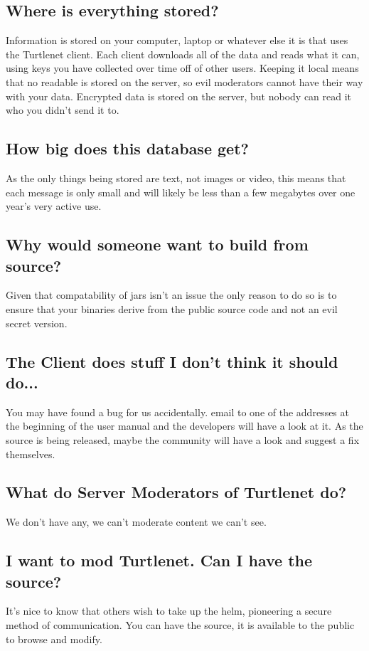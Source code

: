 \subsection{Where is everything stored?}
Information is stored on your computer, laptop or whatever else it is that uses the Turtlenet client.
Each client downloads all of the data and reads what it can, using keys you have
collected over time off of other users.  Keeping it local means that no readable is
stored on the server, so evil moderators cannot have their way with your data.
Encrypted data is stored on the server, but nobody can read it who you didn't
send it to.

\subsection{How big does this database get?}
As the only things being stored are text, not images or video, this means that
each message is only small and will likely be less than a few megabytes over one
year's very active use.

\subsection{Why would someone want to build from source?}
Given that compatability of jars isn't an issue the only reason to do so is to
ensure that your binaries derive from the public source code and not an evil
secret version.

\subsection{The Client does stuff I don't think it should do...}
You may have found a bug for us accidentally.  email to one of the addresses at
the beginning of the user manual and the developers will have a look at it.  As
the source is being released, maybe the community will have a look and suggest a
fix themselves.

\subsection{What do Server Moderators of Turtlenet do?}
We don't have any, we can't moderate content we can't see.

\subsection{I want to mod Turtlenet.  Can I have the source?}
It's nice to know that others wish to take up the helm, pioneering a secure 
method of communication.  You can have the source, it is available to the public
to browse and modify.

